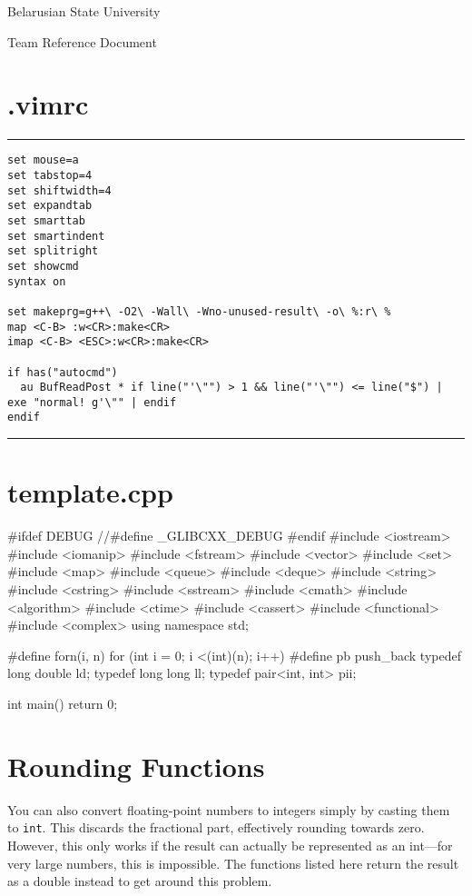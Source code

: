 \documentclass[12pt, titlepage]{article}
\renewcommand{\tt}[1]{\texttt{\small #1}}
\begin{document}
 
\begin{titlepage}
\rule{0pt}{0pt}
\vfill

\centerline{\Huge \textrm{Belarusian State University}}
\vskip 5mm
\centerline{\Large \textsf{Team Reference Document}}

\vfill
\rule{0pt}{0pt}
\end{titlepage}

\section*{.vimrc}

{\color{linescolor}\hrule\vskip2mm}
{\footnotesize\begin{verbatim}
set mouse=a
set tabstop=4
set shiftwidth=4
set expandtab
set smarttab
set smartindent
set splitright
set showcmd
syntax on

set makeprg=g++\ -O2\ -Wall\ -Wno-unused-result\ -o\ %:r\ %
map <C-B> :w<CR>:make<CR>
imap <C-B> <ESC>:w<CR>:make<CR>

if has("autocmd")
  au BufReadPost * if line("'\"") > 1 && line("'\"") <= line("$") | exe "normal! g'\"" | endif
endif
\end{verbatim}
}{\vskip2mm\color{linescolor}\hrule}

\newpage\section*{template.cpp}
\begin{cppcode}
#ifdef DEBUG
//#define _GLIBCXX_DEBUG
#endif
#include <iostream>
#include <iomanip>
#include <fstream>
#include <vector>
#include <set>
#include <map>
#include <queue>
#include <deque>
#include <string>
#include <cstring>
#include <sstream>
#include <cmath>
#include <algorithm>
#include <ctime>
#include <cassert>
#include <functional>
#include <complex>
using namespace std;

#define forn(i, n) for (int i = 0; i <(int)(n); i++)
#define pb push_back
typedef long double ld;
typedef long long ll;
typedef pair<int, int> pii;


int main() {
    return 0;
}
\end{cppcode}

\newpage\tableofcontents

\newpage
\section{Rounding Functions}

You can also convert floating-point numbers to integers simply by casting them to \tt{int}. This discards the fractional part, effectively rounding towards zero. However, this only works if the result can actually be represented as an int—for very large numbers, this is impossible. The functions listed here return the result as a double instead to get around this problem.
\end{document}
